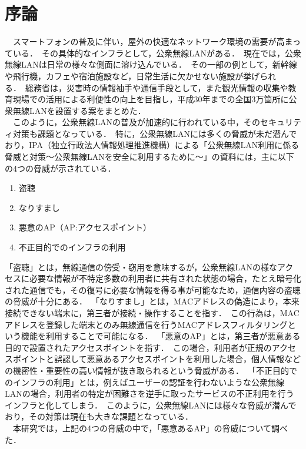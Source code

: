 \documentclass[dvipdfmx]{jsarticle}
\begin{document}
    \section{序論}
        　スマートフォンの普及に伴い，屋外の快適なネットワーク環境の需要が高まっている．\
        その具体的なインフラとして，公衆無線LANがある．\
        現在では，公衆無線LANは日常の様々な側面に溶け込んでいる．\
        その一部の例として，新幹線や飛行機，カフェや宿泊施設など，日常生活に欠かせない施設が挙げられる．\
        総務省は，災害時の情報袖手や通信手段として，また観光情報の収集や教育現場での活用による利便性の向上を目指し，平成30年までの全国3万箇所に公衆無線LANを設置する案をまとめた\cite{SoumuWiFi}．\\
        　このように，公衆無線LANの普及が加速的に行われている中，そのセキュリティ対策も課題となっている．\
        特に，公衆無線LANには多くの脅威が未だ潜んでおり，IPA（独立行政法人情報処理推進機構）による「公衆無線LAN利用に係る脅威と対策～公衆無線LANを安全に利用するために～」の資料\cite{IPA}には，主に以下の4つの脅威が示されている．\
        \begin{enumerate}
            \item 盗聴
            \item なりすまし
            \item 悪意のAP（AP:アクセスポイント）
            \item 不正目的でのインフラの利用
        \end{enumerate}
        「盗聴」とは，無線通信の傍受・窃用を意味するが，公衆無線LANの様なアクセスに必要な情報が不特定多数の利用者に共有された状態の場合，たとえ暗号化された通信でも，その復号に必要な情報を得る事が可能なため，通信内容の盗聴の脅威が十分にある．\
        「なりすまし」とは，MACアドレスの偽造により，本来接続できない端末に，第三者が接続・操作することを指す．\
        この行為は，MACアドレスを登録した端末とのみ無線通信を行うMACアドレスフィルタリングという機能を利用することで可能になる．\
        「悪意のAP」とは，第三者が悪意ある目的で設置されたアクセスポイントを指す．\
        この場合，利用者が正規のアクセスポイントと誤認して悪意あるアクセスポイントを利用した場合，個人情報などの機密性・重要性の高い情報が抜き取られるという脅威がある．\
        「不正目的でのインフラの利用」とは，例えばユーザーの認証を行わないような公衆無線LANの場合，利用者の特定が困難さを逆手に取ったサービスの不正利用を行うインフラと化してしまう．\
        このように，公衆無線LANには様々な脅威が潜んでおり，その対策は現在も大きな課題となっている．\\
        　本研究では，上記の4つの脅威の中で，「悪意あるAP」の脅威について調べた．\
\end{document}
